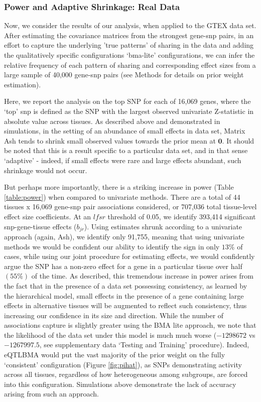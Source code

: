 \subsubsection{Power and Adaptive Shrinkage: Real Data}

Now, we consider the results of our analysis, when applied to the GTEX data set. After estimating the covariance matrices from the strongest gene-snp pairs, in an effort to capture the underlying 'true patterns' of sharing in the data and adding the qualitatively specific configurations `bma-lite' configurations, we can infer the relative frequency of each pattern of sharing and corresponding effect sizes from a large sample of 40,000 gene-snp pairs (see Methods for details on prior weight estimation).

Here, we report the analysis on the top SNP for each of 16,069 genes, where the `top' snp is defined as the SNP with the largest observed univariate Z-statistic in absolute value across tissues. As described above and demonstrated in simulations, in the setting of an abundance of small effects in data set, Matrix Ash tends to shrink small observed values towards the prior mean at $\bm{0}$. It should be noted that this is a result specific to a particular data set, and in that sense `adaptive' - indeed, if small effects were rare and large effects abundant, such shrinkage would not occur. 

But perhaps more importantly, there is a striking increase in power (Table \ref{table:power}) when compared to univariate methods. There are a total of 44 tissues x 16,069 gene-snp pair associations considered, or 707,036 total tissue-level effect size coefficients. At an $lfsr$ threshold of 0.05, we identify 393,414 significant snp-gene-tissue effects ($b_{jr}$). Using estimates shrunk according to a univariate approach (again, Ash),  we identify only 91,755, meaning that using univariate methods we would be confident our ability to identify the sign in only $13\%$ of cases, while using our joint procedure for estimating effects, we would confidently argue the SNP has a non-zero effect for a gene in a particular tissue over half $(55\%)$ of the time. As described, this tremendous increase in power arises from the fact that in the presence of  a data set possessing consistency, as learned by the hierarchical model, small effects in the presence of a gene containing large effects in alternative tissues will be augmented to reflect such consistency, thus increasing our confidence in its size and direction. While the number of associations capture is slightly greater using the BMA lite approach, we note that the likelihood of the data set under this model is much much worse ($-1298672$ vs $-1267997.5$, see supplementary data `Testing and Training' procedure). Indeed, eQTLBMA would put the vast majority of the prior weight on the fully `consistent' configuration (Figure \ref{fig:pihat}), as SNPs demonstrating activity across all tissues, regardless of how heterogeneous among subgroups, are forced into this configuration. Simulations above demonstrate the lack of accuracy arising from such an approach. %


